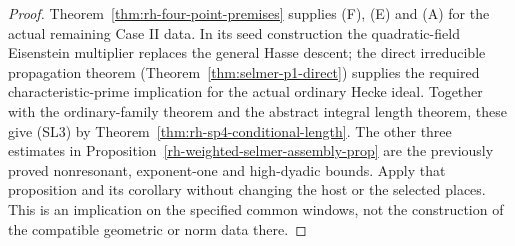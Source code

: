 \begin{proof}
Theorem~\ref{thm:rh-four-point-premises} supplies (F), (E) and (A)
for the actual remaining Case II data. In its seed construction the
quadratic-field Eisenstein multiplier replaces the general Hasse
descent; the direct irreducible propagation theorem
(Theorem~\ref{thm:selmer-p1-direct}) supplies the required
characteristic-prime implication for the actual ordinary Hecke ideal.
Together with the ordinary-family theorem and the abstract integral
length theorem, these give (SL3) by
Theorem~\ref{thm:rh-sp4-conditional-length}.
The other three estimates in
Proposition~\ref{rh-weighted-selmer-assembly-prop}
are the previously proved nonresonant, exponent-one and high-dyadic
bounds. Apply that proposition and its corollary without changing
the host or the selected places. This is an implication on the
specified common windows, not the construction of the compatible
geometric or norm data there.
\end{proof}
